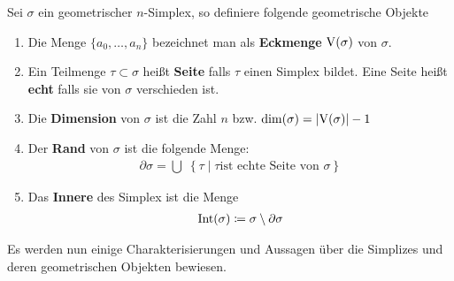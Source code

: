 \begin{Lem}
	
\end{Lem}

\begin{Def}
  Sei $\sigma$ ein geometrischer $n$-Simplex, so definiere folgende
  geometrische Objekte
  \begin{enumerate}[\textbullet]%
  \item Die Menge $\{ a_0 , \ldots , a_n \}$ bezeichnet man als
    \textbf{Eckmenge} $\operatorname{V}(\sigma)$ von $\sigma$.
  \item Ein Teilmenge $\tau \subset \sigma$ heißt \textbf{Seite} falls
	  $\tau$ einen Simplex bildet. Eine Seite heißt \textbf{echt} falls sie von 
		$\sigma$ verschieden ist.
	\item Die \textbf{Dimension} von $\sigma$ ist die Zahl $n$ bzw. 
		$\dim(\sigma) = \left| \operatorname{V}(\sigma) \right| - 1$
  \item Der \textbf{Rand} von $\sigma$ ist die folgende Menge:
    \begin{gather*}
      \partial\sigma = \bigcup \; \left\{ \tau \; \Big| \; \tau \text{
          ist echte Seite von } \sigma \right\}
    \end{gather*}
  \item Das \textbf{Innere} des Simplex ist die Menge
    \begin{gather*}
    	\operatorname{Int}(\sigma) \coloneqq \sigma \setminus \partial\sigma
    \end{gather*}
  \end{enumerate}
\end{Def}


Es werden nun einige Charakterisierungen und Aussagen über die
Simplizes und deren geometrischen Objekten bewiesen.

